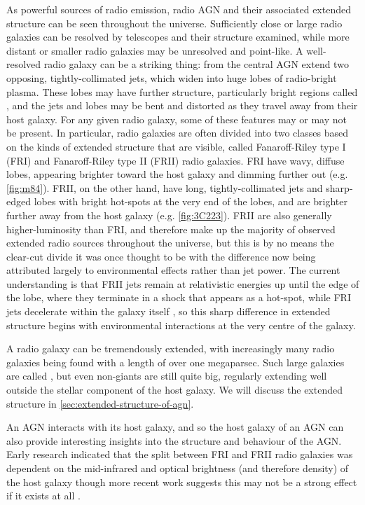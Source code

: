         As powerful sources of radio emission, radio AGN and their associated extended structure can be seen throughout the universe. Sufficiently close or large radio galaxies can be resolved by telescopes and their structure examined, while more distant or smaller radio galaxies may be unresolved and point-like. A well-resolved radio galaxy can be a striking thing: from the central AGN extend two opposing, tightly-collimated jets, which widen into huge lobes of radio-bright plasma. These lobes may have further structure, particularly bright regions called , and the jets and lobes may be bent and distorted as they travel away from their host galaxy. For any given radio galaxy, some of these features may or may not be present. In particular, radio galaxies are often divided into two classes based on the kinds of extended structure that are visible, called Fanaroff-Riley type I (FRI) and Fanaroff-Riley type II (FRII) radio galaxies. FRI have wavy, diffuse lobes, appearing brighter toward the host galaxy and dimming further out (e.g. \autoref{fig:m84}). FRII, on the other hand, have long, tightly-collimated jets and sharp-edged lobes with bright hot-spots \citep{urry_unified_1995} at the very end of the lobes, and are brighter further away from the host galaxy (e.g. \autoref{fig:3C223}). FRII are also generally higher-luminosity \citep{fanaroff_morphology_1974} than FRI, and therefore make up the majority of observed extended radio sources throughout the universe, but this is by no means the clear-cut divide it was once thought to be \citep{mingo_revisiting_2019} with the difference now being attributed largely to environmental effects rather than jet power. The current understanding is that FRII jets remain at relativistic energies up until the edge of the lobe, where they terminate in a shock that appears as a hot-spot, while FRI jets decelerate within the galaxy itself \citep{hardcastle_radio_2020}, so this sharp difference in extended structure begins with environmental interactions at the very centre of the galaxy.

        A radio galaxy can be tremendously extended, with increasingly many radio galaxies being found with a length of over one megaparsec. Such large galaxies are called , but even non-giants are still quite big, regularly extending well outside the stellar component of the host galaxy. We will discuss the extended structure in \autoref{sec:extended-structure-of-agn}.

        An AGN interacts with its host galaxy, and so the host galaxy of an AGN can also provide interesting insights into the structure and behaviour of the AGN. Early research indicated that the split between FRI and FRII radio galaxies was dependent on the mid-infrared and optical brightness (and therefore density) of the host galaxy \citep{ledlow_20_1996,bicknell_relativistic_1995} though more recent work suggests this may not be a strong effect if it exists at all \citep{hardcastle_radio_2020}.

